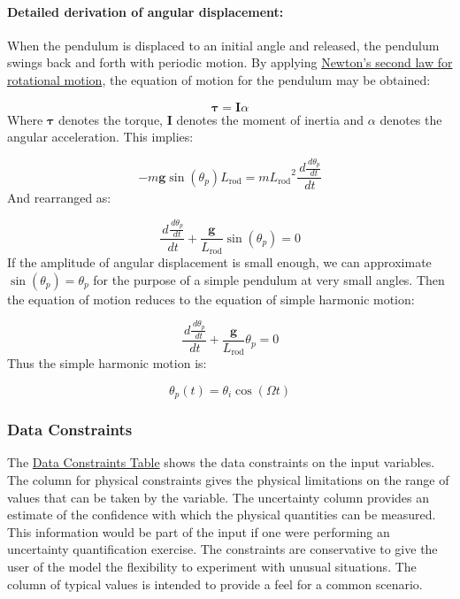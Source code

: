 \documentclass[12pt]{article}
\begin{document}
\paragraph{Detailed derivation of angular displacement:}
\label{IM:calOfAngularDisplacementDeriv}
When the pendulum is displaced to an initial angle and released, the pendulum swings back and forth with periodic motion. By applying \hyperref[TM:NewtonSecLawRotMot]{Newton's second law for rotational motion}, the equation of motion for the pendulum may be obtained:

\begin{displaymath}
\symbf{τ}=\symbf{I} α
\end{displaymath}
Where $\symbf{τ}$ denotes the torque, $\symbf{I}$ denotes the moment of inertia and $α$ denotes the angular acceleration. This implies:

\begin{displaymath}
-m \symbf{g} \sin\left({θ_{p}}\right) {L_{\text{rod}}}=m {L_{\text{rod}}}^{2} \frac{\,d\frac{\,d{θ_{p}}}{\,dt}}{\,dt}
\end{displaymath}
And rearranged as:

\begin{displaymath}
\frac{\,d\frac{\,d{θ_{p}}}{\,dt}}{\,dt}+\frac{\symbf{g}}{{L_{\text{rod}}}} \sin\left({θ_{p}}\right)=0
\end{displaymath}
If the amplitude of angular displacement is small enough, we can approximate $\sin\left({θ_{p}}\right)={θ_{p}}$ for the purpose of a simple pendulum at very small angles. Then the equation of motion reduces to the equation of simple harmonic motion:

\begin{displaymath}
\frac{\,d\frac{\,d{θ_{p}}}{\,dt}}{\,dt}+\frac{\symbf{g}}{{L_{\text{rod}}}} {θ_{p}}=0
\end{displaymath}
Thus the simple harmonic motion is:

\begin{displaymath}
{θ_{p}}\left(t\right)={θ_{i}} \cos\left(Ω t\right)
\end{displaymath}
\subsubsection{Data Constraints}
\label{Sec:DataConstraints}
The \hyperref[Table:InDataConstraints]{Data Constraints Table} shows the data constraints on the input variables. The column for physical constraints gives the physical limitations on the range of values that can be taken by the variable. The uncertainty column provides an estimate of the confidence with which the physical quantities can be measured. This information would be part of the input if one were performing an uncertainty quantification exercise. The constraints are conservative to give the user of the model the flexibility to experiment with unusual situations. The column of typical values is intended to provide a feel for a common scenario.
\end{document}

